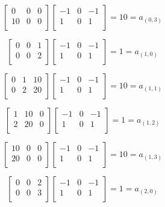 \documentclass[11pt]{article}
\theoremstyle{plain}
\begin{document}
\[
	\begin{bmatrix}
		0  & 0 & 0 \\
		10 & 0 & 0 \\
	\end{bmatrix}
	\begin{bmatrix}
		-1 & 0 & -1 \\
		1  & 0 & 1  \\
	\end{bmatrix}
	= 10 = a_{(0,3)}
\]

\[
	\begin{bmatrix}
		0 & 0 & 1 \\
		0 & 0 & 2 \\
	\end{bmatrix}
	\begin{bmatrix}
		-1 & 0 & -1 \\
		1  & 0 & 1  \\
	\end{bmatrix}
	= 1 = a_{(1,0)}
\]

\[
	\begin{bmatrix}
		0 & 1 & 10 \\
		0 & 2 & 20 \\
	\end{bmatrix}
	\begin{bmatrix}
		-1 & 0 & -1 \\
		1  & 0 & 1  \\
	\end{bmatrix}
	= 10 = a_{(1,1)}
\]

\[
	\begin{bmatrix}
		1 & 10 & 0 \\
		2 & 20 & 0 \\
	\end{bmatrix}
	\begin{bmatrix}
		-1 & 0 & -1 \\
		1  & 0 & 1  \\
	\end{bmatrix}
	= 1 = a_{(1,2)}
\]

\[
	\begin{bmatrix}
		10 & 0 & 0 \\
		20 & 0 & 0 \\
	\end{bmatrix}
	\begin{bmatrix}
		-1 & 0 & -1 \\
		1  & 0 & 1  \\
	\end{bmatrix}
	= 10 = a_{(1,3)}
\]

\[
	\begin{bmatrix}
		0 & 0 & 2 \\
		0 & 0 & 3 \\
	\end{bmatrix}
	\begin{bmatrix}
		-1 & 0 & -1 \\
		1  & 0 & 1  \\
	\end{bmatrix}
	= 1 = a_{(2,0)}
\]
\end{document}
